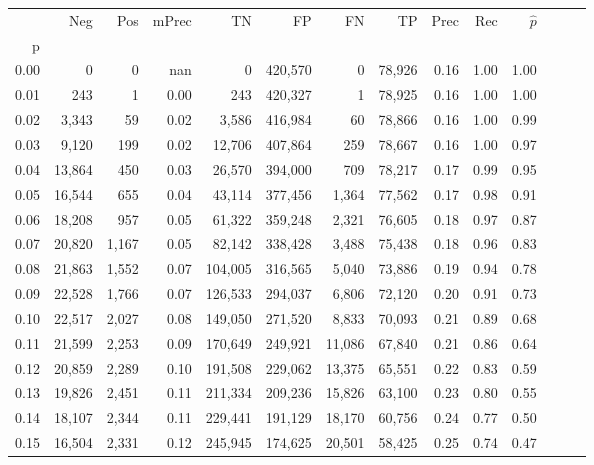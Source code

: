 \begin{tabular}{rrrrrrrrrrrrrr}
\toprule
{} &     Neg &    Pos & mPrec &       TN &       FP &      FN &      TP &  Prec &   Rec & $\hat{p}$ \\
p    &         &        &       &          &          &         &         &       &       &           \\
\midrule
0.00 &       0 &      0 &   nan &        0 &  420,570 &       0 &  78,926 &  0.16 &  1.00 &      1.00 \\
0.01 &     243 &      1 &  0.00 &      243 &  420,327 &       1 &  78,925 &  0.16 &  1.00 &      1.00 \\
0.02 &   3,343 &     59 &  0.02 &    3,586 &  416,984 &      60 &  78,866 &  0.16 &  1.00 &      0.99 \\
0.03 &   9,120 &    199 &  0.02 &   12,706 &  407,864 &     259 &  78,667 &  0.16 &  1.00 &      0.97 \\
0.04 &  13,864 &    450 &  0.03 &   26,570 &  394,000 &     709 &  78,217 &  0.17 &  0.99 &      0.95 \\
0.05 &  16,544 &    655 &  0.04 &   43,114 &  377,456 &   1,364 &  77,562 &  0.17 &  0.98 &      0.91 \\
0.06 &  18,208 &    957 &  0.05 &   61,322 &  359,248 &   2,321 &  76,605 &  0.18 &  0.97 &      0.87 \\
0.07 &  20,820 &  1,167 &  0.05 &   82,142 &  338,428 &   3,488 &  75,438 &  0.18 &  0.96 &      0.83 \\
0.08 &  21,863 &  1,552 &  0.07 &  104,005 &  316,565 &   5,040 &  73,886 &  0.19 &  0.94 &      0.78 \\
0.09 &  22,528 &  1,766 &  0.07 &  126,533 &  294,037 &   6,806 &  72,120 &  0.20 &  0.91 &      0.73 \\
0.10 &  22,517 &  2,027 &  0.08 &  149,050 &  271,520 &   8,833 &  70,093 &  0.21 &  0.89 &      0.68 \\
0.11 &  21,599 &  2,253 &  0.09 &  170,649 &  249,921 &  11,086 &  67,840 &  0.21 &  0.86 &      0.64 \\
0.12 &  20,859 &  2,289 &  0.10 &  191,508 &  229,062 &  13,375 &  65,551 &  0.22 &  0.83 &      0.59 \\
0.13 &  19,826 &  2,451 &  0.11 &  211,334 &  209,236 &  15,826 &  63,100 &  0.23 &  0.80 &      0.55 \\
0.14 &  18,107 &  2,344 &  0.11 &  229,441 &  191,129 &  18,170 &  60,756 &  0.24 &  0.77 &      0.50 \\
0.15 &  16,504 &  2,331 &  0.12 &  245,945 &  174,625 &  20,501 &  58,425 &  0.25 &  0.74 &      0.47 \\

\end{tabular}
